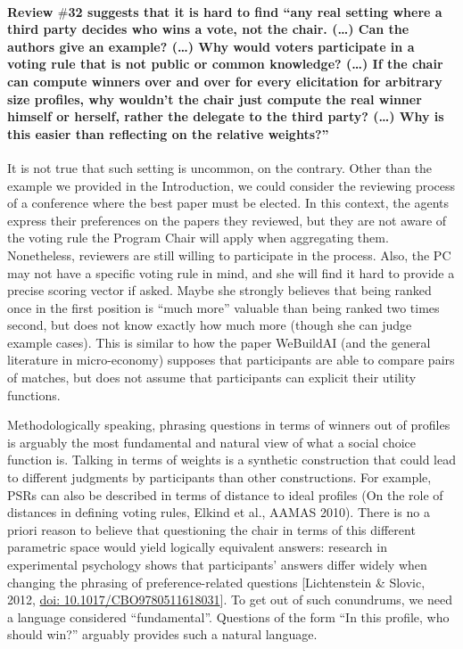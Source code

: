\documentclass{article}
\begin{document}
\paragraph{Review $\#$32 suggests that it is hard to find “any real setting where a third party decides who wins a vote, not the chair. (…) Can the authors give an example? (…) Why would voters participate in a voting rule that is not public or common knowledge? (…) If the chair can compute winners over and over for every elicitation for arbitrary size profiles, why wouldn't the chair just compute the real winner himself or herself, rather the delegate to the third party? (…) Why is this easier than reflecting on the relative weights?”}
It is not true that such setting is uncommon, on the contrary. Other than the example we provided in the Introduction, we could consider the reviewing process of a conference where the best paper must be elected. In this context, the agents express their preferences on the papers they reviewed, but they are not aware of the voting rule the Program Chair will apply when aggregating them. Nonetheless, reviewers are still willing to participate in the process. 
Also, the PC may not have a specific voting rule in mind, and she will find it hard to provide a precise scoring vector if asked. Maybe she strongly believes that being ranked once in the first position is “much more” valuable than being ranked two times second, but does not know exactly how much more (though she can judge example cases). This is similar to how the paper WeBuildAI (and the general literature in micro-economy) supposes that participants are able to compare pairs of matches, but does not assume that participants can explicit their utility functions. 

Methodologically speaking, phrasing questions in terms of winners out of profiles is arguably the most fundamental and natural view of what a social choice function is. Talking in terms of weights is a synthetic construction that could lead to different judgments by participants than other constructions. 
For example, PSRs can also be described in terms of distance to ideal profiles (On the role of distances in defining voting rules, Elkind et al., AAMAS 2010). 
There is no a priori reason to believe that questioning the chair in terms of this different parametric space would yield logically equivalent answers: research in experimental psychology shows that participants’ answers differ widely when changing the phrasing of preference-related questions [Lichtenstein \& Slovic, 2012, \href{https://doi.org/10.1017/CBO9780511618031}{doi: 10.1017/CBO9780511618031}].
To get out of such conundrums, we need a language considered “fundamental”. Questions of the form “In this profile, who should win?” arguably provides such a natural language.
\end{document}
